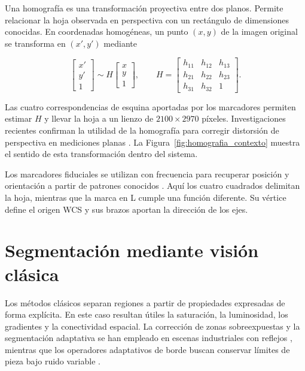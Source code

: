 Una homografía es una transformación proyectiva entre dos planos. Permite relacionar la hoja observada en perspectiva con un rectángulo de dimensiones conocidas. En coordenadas homogéneas, un punto $(x,y)$ de la imagen original se transforma en $(x',y')$ mediante

\begin{equation}
\begin{bmatrix}
x' \\ y' \\ 1
\end{bmatrix}
\sim
H
\begin{bmatrix}
x \\ y \\ 1
\end{bmatrix},
\qquad
H =
\begin{bmatrix}
h_{11} & h_{12} & h_{13} \\
h_{21} & h_{22} & h_{23} \\
h_{31} & h_{32} & 1
\end{bmatrix}.
\label{eq:homografia}
\end{equation}

Las cuatro correspondencias de esquina aportadas por los marcadores permiten estimar $H$ y llevar la hoja a un lienzo de $2100 \times 2970$ píxeles. Investigaciones recientes confirman la utilidad de la homografía para corregir distorsión de perspectiva en mediciones planas \cite{Wang2025}. La Figura~\ref{fig:homografia_contexto} muestra el sentido de esta transformación dentro del sistema.


Los marcadores fiduciales se utilizan con frecuencia para recuperar posición y orientación a partir de patrones conocidos \cite{GarridoJurado2014}. Aquí los cuatro cuadrados delimitan la hoja, mientras que la marca en L cumple una función diferente. Su vértice define el origen WCS y sus brazos aportan la dirección de los ejes.

\section{Segmentación mediante visión clásica}

Los métodos clásicos separan regiones a partir de propiedades expresadas de forma explícita. En este caso resultan útiles la saturación, la luminosidad, los gradientes y la conectividad espacial. La corrección de zonas sobreexpuestas y la segmentación adaptativa se han empleado en escenas industriales con reflejos \cite{Li2023}, mientras que los operadores adaptativos de borde buscan conservar límites de pieza bajo ruido variable \cite{Li2024}.

